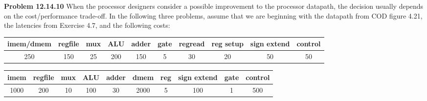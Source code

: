 \documentclass{article}
\begin{document}
    \textbf{Problem 12.14.10} When the processor designers consider a possible improvement to the processor datapath, the decision usually depends on the cost/performance trade-off. In the following three problems, assume that we are beginning with the datapath from COD figure 4.21, the latencies from Exercise 4.7, and the following costs:
    
    \begin{table}[ht]
        \centering
        \resizebox{\textwidth}{!}
        {\begin{tabular}{cccccccccc}
            \hline
            imem/dmem & regfile & mux & ALU & adder & gate & regread & reg setup & sign extend & control\\
            \hline
            250 & 150 & 25 & 200 & 150 & 5 & 30 & 20 & 50 & 50\\
            \hline
        \end{tabular}}
    \end{table}

    \begin{table}[ht]
        \centering
        \resizebox{\textwidth}{!}
        {\begin{tabular}{cccccccccc}
            \hline
            imem & regfile & mux & ALU & adder & dmem & reg & sign extend & gate & control\\
            \hline
            1000 & 200 & 10 & 100 & 30 & 2000 & 5 & 100 & 1 & 500\\
            \hline
        \end{tabular}}
    \end{table}
    
\end{document}
